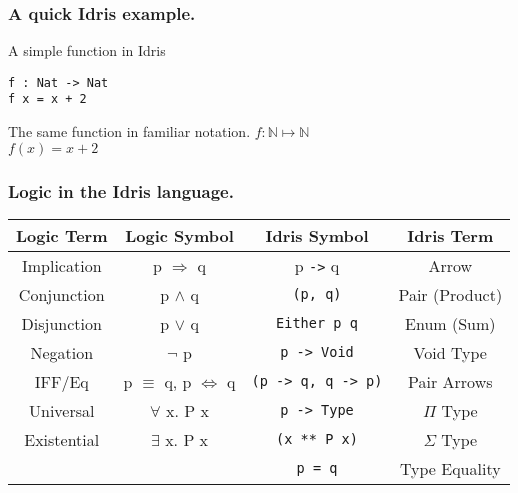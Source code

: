 \documentclass{beamer}
\begin{document}
\begin{frame}[fragile]
  \frametitle{A quick Idris example.}
  \begin{block}{A simple function in Idris}
  \begin{verbatim}
f : Nat -> Nat
f x = x + 2
  \end{verbatim}
  \end{block}
  \begin{block}{The same function in familiar notation.}
$f : \mathbb{N} \mapsto \mathbb{N}$ \\
$f(x) = x + 2$
  \end{block}
\end{frame}


\begin{frame}[fragile]
 \frametitle{Logic in the Idris language.}
    \begin{table}[h!]
    \begin{tabular}{c|c|c|c}
    \textbf{Logic Term} & \textbf{Logic Symbol} & 
            \textbf{Idris Symbol} & \textbf{Idris Term} \\
    \hline
      Implication & p $\Rightarrow$ q & p \texttt{->} q
      & Arrow \\
      Conjunction & p $\land$ q & \texttt{(p, q)}
      & Pair (Product) \\ 
      Disjunction & p $\lor$ q & \texttt{Either p q}
      & Enum (Sum)\\
      Negation & $\lnot$ p & \texttt{p -> Void} &
      Void Type \\ 
      IFF/Eq & p $\equiv$ q, p $\iff$ q & \texttt{(p -> q, q -> p)}  
      & Pair Arrows \\
      Universal & $\forall$ x. P x &
      \texttt{p -> Type} & $\Pi$ Type \\
      Existential & $\exists$ x. P x
      & \texttt{(x ** P x)} & $\Sigma$ Type \\
      \hline
       & & \texttt{p = q} & Type Equality
    \end{tabular}
  \end{table}
\end{frame}


\end{document}
